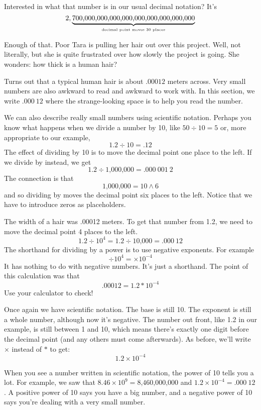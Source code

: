 Interested in what that number is in our usual decimal notation?  It's
$$2, \underbrace{ \hbox{$\text{700,000,000,000,000,000,000,000,000,000} $}}_{\hbox{\begin{tiny} decimal point moves 30 places \end{tiny}}}$$

Enough of that. Poor Tara is pulling her hair out over this project.  Well, not literally, but she is quite frustrated over how slowly the project is going.  She wonders: how thick is a human hair?  

Turns out that a typical human hair is about $.00012$ meters across.  Very small numbers are also awkward to read and awkward to work with.  In this section, we write  $.000~12$ where the strange-looking space is to help you read the number.  
 
We can also describe really small numbers using scientific notation.  Perhaps you know what happens when we divide a number by 10, like
$ 50 \div 10 = 5$ or, more appropriate to our example, $$ 1.2 \div 10 = .12$$
The effect of dividing by 10 is to move the decimal point one place to the left.
If we divide by  instead, we get
$$ 1.2 \div \text{1,000,000} = .000~001~2 $$ 
The connection is that $$ \text{1,000,000} = 10 \wedge 6  $$
and so dividing by  moves the decimal point six places to the left.  Notice that we have to introduce zeros as placeholders.

The width of a hair was .00012 meters.  To get that number from 1.2, we need to move the decimal point 4 places to the left.  $$1.2 \div 10^4 = 1.2 \div \text{10,000} = .000~12$$
The shorthand for dividing by a power is to use negative exponents.  For example
$$ \div 10^4 = \times 10^{-4}$$
It has nothing to do with negative numbers.  It's just a shorthand.
The point of this calculation was that $$.00012= 1.2 \ast10^{-4}$$
Use your calculator to check!

Once again we have scientific notation.  The base is still 10.  The exponent is still a whole number, although now it's negative.  The number out front, like 1.2 in our example, is still between 1 and 10, which means there's exactly one digit before the decimal point (and any others must come afterwards).  As before, we'll write $\times$ instead of $\ast$ to get: $$1.2 \times 10^{-4}$$


When you see a number written in scientific notation, the power of 10 tells you a lot.  For example, we saw that $8.46 \times 10^ 9 = \text{8,460,000,000}$ and $1.2 \times10^{-4} = .000~12 $.  A positive power of 10 says you have a big number, and a negative power of 10 says you're dealing with a very small number. 
\bigskip

